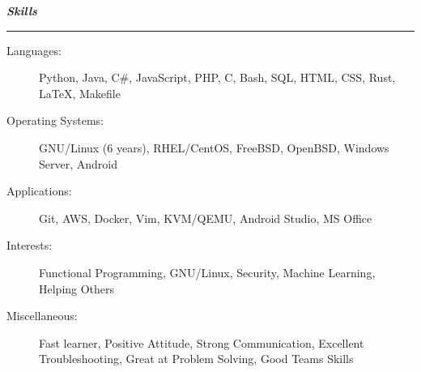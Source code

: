 \documentclass[letterpaper,11pt]{article}
\newcommand{\mysection}[1]{\vspace{5pt} {\bfseries \textsl{#1}} \\ {\color{gray} \rule[5pt]{\textwidth}{1pt}}}
\begin{document}
\mysection{Skills}
\begin{description}
    \item[Languages:]
        Python, Java, C\#, JavaScript, PHP, C, Bash, SQL, HTML, CSS, Rust, \LaTeX{}, Makefile
    \item[Operating Systems:]
        GNU/Linux (6 years), RHEL/CentOS, FreeBSD, OpenBSD, Windows Server, Android
    \item[Applications:]
        Git, AWS, Docker, Vim, KVM/QEMU, Android Studio, MS Office
    \item[Interests:]
        Functional Programming, GNU/Linux, Security, Machine Learning, Helping Others
    \item[Miscellaneous:]
        Fast learner, Positive Attitude, Strong Communication, Excellent Troubleshooting, Great at Problem Solving, Good Teams Skills
\end{description}
\end{document}
